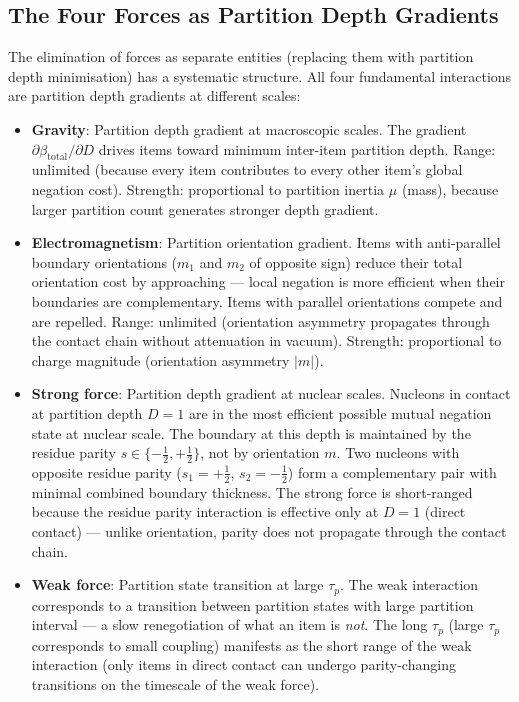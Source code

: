 \documentclass[11pt,twocolumn,a4paper]{article}
\theoremstyle{plain}
\theoremstyle{definition}
\theoremstyle{remark}
\begin{document}
\subsection{The Four Forces as Partition Depth Gradients}
\label{subsec:forces}

The elimination of forces as separate entities (replacing them with partition
depth minimisation) has a systematic structure. All four fundamental interactions
are partition depth gradients at different scales:

\begin{itemize}
    \item \textbf{Gravity}: Partition depth gradient at macroscopic scales.
          The gradient $\partial\beta_{\mathrm{total}}/\partial D$ drives items
          toward minimum inter-item partition depth. Range: unlimited (because
          every item contributes to every other item's global negation cost).
          Strength: proportional to partition inertia $\mu$ (mass), because
          larger partition count generates stronger depth gradient.

    \item \textbf{Electromagnetism}: Partition orientation gradient. Items with
          anti-parallel boundary orientations ($m_1$ and $m_2$ of opposite sign)
          reduce their total orientation cost by approaching --- local negation is
          more efficient when their boundaries are complementary. Items with
          parallel orientations compete and are repelled. Range: unlimited
          (orientation asymmetry propagates through the contact chain without
          attenuation in vacuum). Strength: proportional to charge magnitude
          (orientation asymmetry $|m|$).

    \item \textbf{Strong force}: Partition depth gradient at nuclear scales.
          Nucleons in contact at partition depth $D = 1$ are in the most
          efficient possible mutual negation state at nuclear scale. The boundary
          at this depth is maintained by the residue parity $s \in
          \{-\frac{1}{2}, +\frac{1}{2}\}$, not by orientation $m$. Two nucleons
          with opposite residue parity ($s_1 = +\frac{1}{2}$, $s_2 =
          -\frac{1}{2}$) form a complementary pair with minimal combined
          boundary thickness. The strong force is short-ranged because the
          residue parity interaction is effective only at $D = 1$ (direct
          contact) --- unlike orientation, parity does not propagate through
          the contact chain.

    \item \textbf{Weak force}: Partition state transition at large $\tau_p$.
          The weak interaction corresponds to a transition between partition
          states with large partition interval --- a slow renegotiation of what
          an item is \emph{not}. The long $\tau_p$ (large $\tau_p$ corresponds
          to small coupling) manifests as the short range of the weak interaction
          (only items in direct contact can undergo parity-changing transitions
          on the timescale of the weak force).
\end{itemize}
\end{document}
